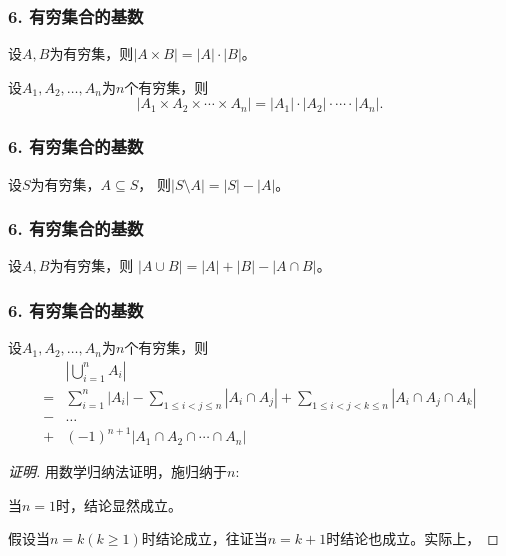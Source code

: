 \documentclass{beamer}
\begin{document}
\begin{CJK*}{UTF8}{gbsn}
\begin{frame}
  \frametitle{6. 有穷集合的基数}
  \begin{Thm}
    设$A,B$为有穷集，则$|A \times B| = |A| \cdot |B|$。
  \end{Thm}
\pause
  \begin{Thm}
    设$A_1,A_2, \ldots, A_n$为$n$个有穷集，则\[|A_1 \times A_2 \times \cdots \times A_n|=|A_1|\cdot |A_2| \cdot \cdots \cdot |A_n|.\]
  \end{Thm}
\end{frame}

\begin{frame}
\frametitle{6. 有穷集合的基数}
\begin{Thm}
  设$S$为有穷集，$A \subseteq S$， 则$|S\setminus A| = |S| - |A|$。
\end{Thm}
\end{frame}

\begin{frame}
\frametitle{6. 有穷集合的基数}
\begin{Thm}
  设$A,B$为有穷集，则
$|A \cup B| = |A| + |B| - |A \cap B|$。
\end{Thm}\pause
\end{frame}
\begin{frame}
  \frametitle{6. 有穷集合的基数}
\begin{Thm}
  设$A_1, A_2, \ldots, A_n$为$n$个有穷集，则
  \begin{equation*}
\begin{split}
    &|\bigcup_{i=1}^nA_i|\\
=&\sum_{i=1}^n|A_i| - \sum_{1\leq i < j \leq n}|A_i \cap A_j| + \sum_{1 \leq  i < j < k \leq n}|A_i \cap A_j \cap A_k|\\
-&\ldots\\
+&(-1)^{n+1}|A_1 \cap A_2 \cap \cdots \cap A_n| 
  \end{split}
\end{equation*}
\end{Thm}
\end{frame}

\begin{frame}
  \begin{proof}[证明]
    用数学归纳法证明，施归纳于$n$:

当$n=1$时，结论显然成立。

假设当$n=k(k \geq 1)$时结论成立，往证当$n=k+1$时结论也成立。实际上，


\end{proof}
\end{frame}
\end{CJK*}
\end{document}
